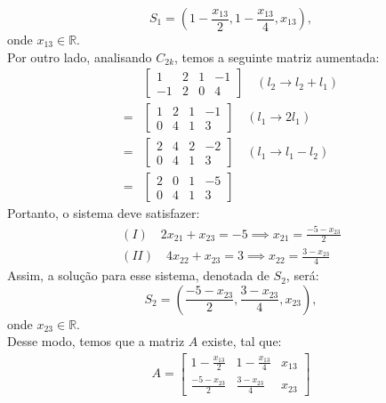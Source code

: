 \begin{displaymath}
    S_1 = (1 - \frac{x_{13}}{2}, 1 -\frac{x_{13}}{4}, x_{13}),
\end{displaymath}
onde $x_{13} \in \mathbb{R}$. \\
Por outro lado, analisando $C_{2k}$, temos a seguinte matriz aumentada:
\begin{align*}
    &\left[\begin{array}{cccc} 
    1 & 2 & 1 & -1 \\
    -1 & 2 & 0 & 4
    \end{array}\right] \quad (l_2 \rightarrow l_2 + l_1)\\ 
    = 
    &\left[\begin{array}{cccc} 
    1 & 2 & 1 & -1 \\
    0 & 4 & 1 & 3
    \end{array}\right] \quad (l_1 \rightarrow 2l_1) \\
    =
    &\left[\begin{array}{cccc} 
    2 & 4 & 2 & -2 \\
    0 & 4 & 1 & 3
    \end{array}\right] \quad (l_1 \rightarrow l_1 - l_2) \\
    =
    &\left[\begin{array}{cccc} 
    2 & 0 & 1 & -5 \\
    0 & 4 & 1 & 3
    \end{array}\right]
\end{align*}
Portanto, o sistema deve satisfazer:
\begin{align*} 
    (I) \quad 2x_{21} + x_{23} = -5 \implies x_{21} = \frac{-5 - x_{23}}{2} \\
    (II) \quad 4x_{22} + x_{23} = 3 \implies x_{22} = \frac{3 - x_{23}}{4}
\end{align*}
Assim, a solução para esse sistema, denotada de $S_2$, será:
\begin{displaymath}
    S_2 = (\frac{-5 - x_{23}}{2}, \frac{3 - x_{23}}{4}, x_{23}),
\end{displaymath}
onde $x_{23} \in \mathbb{R}$. \\
Desse modo, temos que a matriz $A$ existe, tal que:
\begin{align*}
    A = \left[\begin{array}{ccc} 
    1 - \frac{x_{13}}{2} & 1 - \frac{x_{13}}{4} & x_{13} \\
    \frac{-5 - x_{23}}{2} & \frac{3 - x_{23}}{4} & x_{23}
    \end{array} \right]
\end{align*}